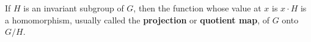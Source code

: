 If $H$ is an invariant subgroup of $G$, then the function whose value at $x$ is $x \cdot H$ is a homomorphism, usually called the \textbf{projection} or \textbf{quotient map}, of $G$ onto $G/H$.
